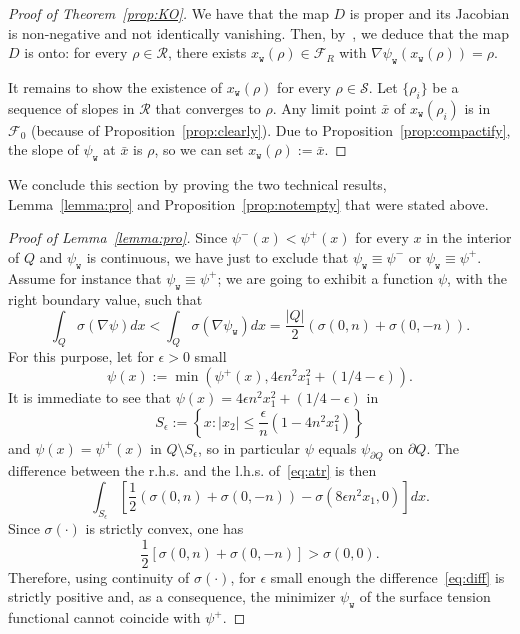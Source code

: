 \documentclass[AHL,Unicode,longabstracts,published]{cedram}
\newcommand{\psiw}{\psi_{\mathtt w}}
\newcommand{\ttw}{\mathtt{w}}
\newcommand{\clS}{\mathcal{S}}
\newcommand{\clR}{\mathcal{R}}
\newcommand{\clF}{\mathcal{F}}
\newcommand{\ttw}{\mathtt{w}}
\begin{document}
\begin{proof}[Proof of Theorem~\ref{prop:KO}]
We have that the map $D$ is proper and its Jacobian is non-negative and not identically vanishing. Then, by~\cite[Theorem~1]{nijenhuis1962theorem}, we deduce that the map $D$ is onto: for every $\rho\in \clR$, there exists $x_{\ttw}(\rho)\in \clF_R$ with $\nabla \psi_{\ttw}(x_{\ttw}(\rho))=\rho$.



It remains to show the existence of $x_{\ttw}(\rho)$ for every $\rho\in \clS$. Let $\{\rho_i\}$ be a sequence of slopes in $\clR$ that converges to $\rho$. Any limit point $\bar x$ of $x_{\ttw}(\rho_i)$ is in $\clF_0$ (because of Proposition~\ref{prop:clearly}). Due to Proposition~\ref{prop:compactify}, the slope of $\psiw$ at $\bar x$ is $\rho$, so we can set $x_{\ttw}(\rho):=\bar x$.
\end{proof}

We conclude this section by proving the two technical results, Lemma~\ref{lemma:pro} and Proposition~\ref{prop:notempty} that were stated above.

\begin{proof}[Proof of Lemma~\ref{lemma:pro}]
Since $\psi^-(x)<\psi^+(x)$ for every $x$ in the interior of $Q$ and $\psi_{\ttw}$ is continuous, we have just to exclude that $\psi_{\ttw}\equiv \psi^-$ or $\psi_{\ttw}\equiv \psi^+$. Assume for instance that $\psi_{\ttw}\equiv \psi^+$; we are going to exhibit a function $\psi$, with the right boundary value, such that
\begin{equation}\label{eq:atr}
\int_Q \sigma(\nabla\psi)dx<\int_Q\sigma(\nabla\psi_{\ttw})d x=\frac{|Q|}2(\sigma(0,n)+\sigma(0,- n)).
\end{equation}
For this purpose, let for $\epsilon>0$ small
\[
\psi(x):=\min\left(\psi^+(x),4 \epsilon n^2 x_1^2+(1/4-\epsilon)\right).
\]
It is immediate to see that $\psi(x)=4\epsilon n^2 x_1^2+(1/4-\epsilon)$ in
\[
S_\epsilon:=\left\{x:|x_2|\le \frac{\epsilon}{n} \left(1-4n^2 x_1^2\right)\right\}
\]
and $\psi(x)=\psi^+(x)$ in $Q\setminus S_\epsilon$, so in particular $\psi$ equals $\psi_{\partial Q}$ on $\partial Q$. The difference between the r.h.s. and the l.h.s. of~\eqref{eq:atr} is then
\begin{equation}\label{eq:diff}
\int_{S_\epsilon}\left[\frac12\left(\sigma(0,n)+\sigma(0,-n)\right)-\sigma\left(8 \epsilon n^2 x_1,0\right)\right]dx.
\end{equation}
Since $\sigma(\cdot)$ is strictly convex, one has
\[
\frac12\left[\sigma(0,n)+\sigma(0,-n)\right]>\sigma(0,0).
\]
Therefore, using continuity of $\sigma(\cdot)$, for $\epsilon$ small enough the difference~\eqref{eq:diff} is strictly positive and, as a consequence, the minimizer $\psi_{\ttw}$ of the surface tension functional cannot coincide with $\psi^+$.
\end{proof}
\end{document}
